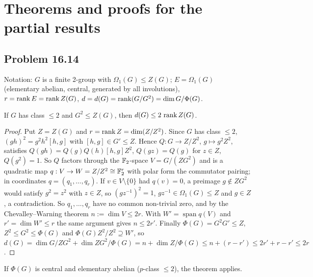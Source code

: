 \section{Theorems and proofs for the partial results}\label{app:partial}

\subsection{Problem 16.14}\label{app:1614}
Notation: $G$ is a finite 2-group with $\Omega_1(G)\le Z(G)$; $E=\Omega_1(G)$ (elementary abelian, central,
generated by all involutions), $r=\operatorname{rank} E=\operatorname{rank} Z(G)$, $d=d(G)=\operatorname{rank}(G/G^2)=\dim G/\Phi(G)$.

\begin{theorem}[class $\le 2$]\label{thm:1614A}
If $G$ has class $\le 2$ and $G^2\le Z(G)$, then $d(G)\le 2\,\operatorname{rank} Z(G)$.
\end{theorem}
\begin{proof}
Put $Z=Z(G)$ and $r=\operatorname{rank} Z=\dim(Z/Z^2)$. Since $G$ has class $\le 2$, $(gh)^2=g^2h^2[h,g]$ with $[h,g]\in G'\le Z$.
Hence $Q:G\to Z/Z^2$, $g\mapsto g^2Z^2$, satisfies $Q(gh)=Q(g)Q(h)[h,g]Z^2$, $Q(gz)=Q(g)$ for $z\in Z$, $Q(g^2)=1$.
So $Q$ factors through the $\mathbb{F}_2$-space $V=G/(ZG^2)$ and is a quadratic map $q:V\to W=Z/Z^2\cong\mathbb{F}_2^r$ with polar
form the commutator pairing; in coordinates $q=(q_1,\dots,q_r)$. If $v\in V\setminus\{0\}$ had $q(v)=0$, a
preimage $g\notin ZG^2$ would satisfy $g^2=z^2$ with $z\in Z$, so $(gz^{-1})^2=1$, $gz^{-1}\in\Omega_1(G)\le Z$ and
$g\in Z$, a contradiction. So $q_1,\dots,q_r$ have no common non-trivial zero, and by the Chevalley--Warning theorem
$n:=\dim V\le 2r$. With $W'=\operatorname{span}q(V)$ and $r'=\dim W'\le r$ the same argument gives $n\le 2r'$.
Finally $\Phi(G)=G^2G'\le Z$, $Z^2\le G^2\le\Phi(G)$ and $\Phi(G)Z^2/Z^2\supseteq W'$, so
$d(G)=\dim G/ZG^2+\dim ZG^2/\Phi(G)=n+\dim Z/\Phi(G)\le n+(r-r')\le 2r'+r-r'\le 2r$.
\end{proof}
If $\Phi(G)$ is central and elementary abelian ($p$-class $\le 2$), the theorem applies.

